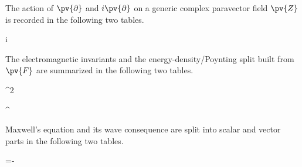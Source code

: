 \noindent The action of \(\pv{\partial}\) and \(i\pv{\partial}\) on a generic complex paravector field \(\pv{Z}\) is recorded in the following two tables.
\begin{componenttable}{\pv{\partial} }
\end{componenttable}

\begin{componenttable}{i\,\pv{\partial} }
\end{componenttable}

\noindent The electromagnetic invariants and the energy-density/Poynting split built from \(\pv{F}\) are summarized in the following two tables.
\begin{componenttable}{^{2}}
\end{componenttable}

\begin{componenttable}{ ^{\Hop}}
\end{componenttable}

\noindent Maxwell's equation and its wave consequence are split into scalar and vector parts in the following two tables.
\begin{componenttable}{\pv{\partial} =\rho-\cdot\sigv}
\end{componenttable}

